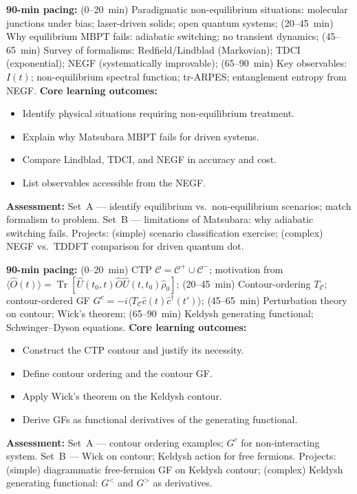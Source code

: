 \documentclass[11pt,a4paper]{article}
\begin{document}
\begin{tcolorbox}[modulebox, title={Module~II.5 --- Lecture L01: Motivation and Scope of NEGF}]
\textbf{90-min pacing:} (0--20~min) Paradigmatic non-equilibrium situations: molecular junctions under bias; laser-driven solids; open quantum systems; (20--45~min) Why equilibrium MBPT fails: adiabatic switching; no transient dynamics; (45--65~min) Survey of formalisms: Redfield/Lindblad (Markovian); TDCI (exponential); NEGF (systematically improvable); (65--90~min) Key observables: $I(t)$; non-equilibrium spectral function; tr-ARPES; entanglement entropy from NEGF.
\medskip\textbf{Core learning outcomes:}
\begin{itemize}[leftmargin=1.4em,topsep=2pt,itemsep=1pt]
  \item Identify physical situations requiring non-equilibrium treatment.
  \item Explain why Matsubara MBPT fails for driven systems.
  \item Compare Lindblad, TDCI, and NEGF in accuracy and cost.
  \item List observables accessible from the NEGF.
\end{itemize}
\medskip\textbf{Assessment:}
Set~A --- identify equilibrium vs.\ non-equilibrium scenarios; match formalism to problem.
Set~B --- limitations of Matsubara: why adiabatic switching fails.
Projects: (simple) scenario classification exercise; (complex) NEGF vs.\ TDDFT comparison for driven quantum dot.
\end{tcolorbox}

\medskip

\begin{tcolorbox}[modulebox, title={Module~II.5 --- Lecture L02: The Keldysh Contour}]
\textbf{90-min pacing:} (0--20~min) CTP $\mathcal{C}=\mathcal{C}^+\cup\mathcal{C}^-$; motivation from $\langle\hat{O}(t)\rangle=\operatorname{Tr}[\hat{U}(t_0,t)\hat{O}\hat{U}(t,t_0)\hat\rho_0]$; (20--45~min) Contour-ordering $T_\mathcal{C}$; contour-ordered GF $G^c=-i\langle T_\mathcal{C}\hat{c}(t)\hat{c}^\dagger(t')\rangle$; (45--65~min) Perturbation theory on contour; Wick's theorem; (65--90~min) Keldysh generating functional; Schwinger--Dyson equations.
\medskip\textbf{Core learning outcomes:}
\begin{itemize}[leftmargin=1.4em,topsep=2pt,itemsep=1pt]
  \item Construct the CTP contour and justify its necessity.
  \item Define contour ordering and the contour GF.
  \item Apply Wick's theorem on the Keldysh contour.
  \item Derive GFs as functional derivatives of the generating functional.
\end{itemize}
\medskip\textbf{Assessment:}
Set~A --- contour ordering examples; $G^c$ for non-interacting system.
Set~B --- Wick on contour; Keldysh action for free fermions.
Projects: (simple) diagrammatic free-fermion GF on Keldysh contour; (complex) Keldysh generating functional: $G^<$ and $G^>$ as derivatives.
\end{tcolorbox}
\end{document}
